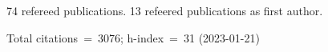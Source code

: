 74 refereed publications. 13 refeered publications as first author.

Total citations~=~3076; h-index~=~31 (2023-01-21)
